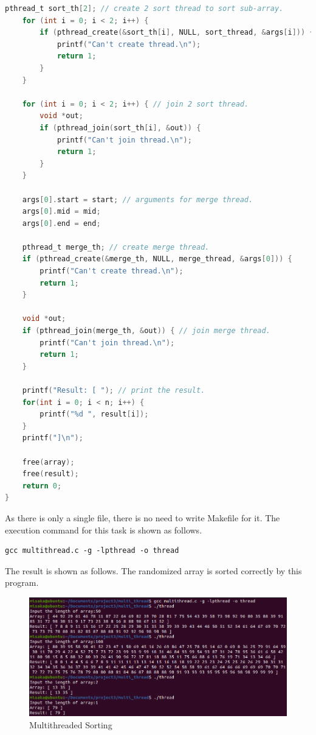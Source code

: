 \documentclass[UTF8,10pt,a4paper]{article}
\theoremstyle{Problem}
\theoremstyle{Solution}
\begin{document}
\begin{lstlisting}[language = c]
    pthread_t sort_th[2]; // create 2 sort thread to sort sub-array.
    for (int i = 0; i < 2; i++) {
        if (pthread_create(&sort_th[i], NULL, sort_thread, &args[i])) {
            printf("Can't create thread.\n");
            return 1;
        }
    }

    for (int i = 0; i < 2; i++) { // join 2 sort thread.
        void *out;
        if (pthread_join(sort_th[i], &out)) {
            printf("Can't join thread.\n");
            return 1;
        }
    }
    
    args[0].start = start; // arguments for merge thread.
    args[0].mid = mid;
    args[0].end = end;
    
    pthread_t merge_th; // create merge thread.
    if (pthread_create(&merge_th, NULL, merge_thread, &args[0])) {
        printf("Can't create thread.\n");
        return 1;
    }
    
    void *out; 
    if (pthread_join(merge_th, &out)) { // join merge thread.
        printf("Can't join thread.\n");
        return 1;
    }

    printf("Result: [ "); // print the result.
    for(int i = 0; i < n; i++) {
        printf("%d ", result[i]);
    }
    printf("]\n");

    free(array);
    free(result);
    return 0;
}
\end{lstlisting}


As there is only a single file, there is no need to write Makefile for it. The execution command for this task is shown as follows.
\begin{lstlisting}
gcc multithread.c -g -lpthread -o thread
\end{lstlisting}


The result is shown as follows. The randomized array is sorted correctly by this program.
\begin{figure}[H]
    \centering
    \includegraphics[width=400pt]{thread.png}
    \caption{Multithreaded Sorting}
    \label{3}
\end{figure}
\end{document}
